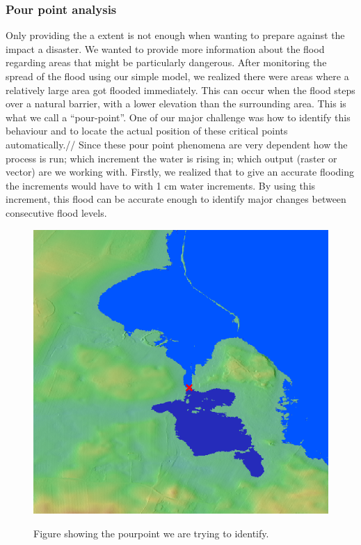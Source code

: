 \subsubsection{Pour point analysis}
Only providing the a extent is not enough when wanting to prepare against the impact a disaster. We wanted to provide more information about the flood regarding areas that might be particularly dangerous. After monitoring the  spread of the flood using our simple model, we realized there were areas where a relatively large area got flooded immediately. This can occur when the flood steps over a natural barrier, with a lower elevation than the surrounding area. This is what we call a “pour-point”. One of our major challenge was how to identify this behaviour and to locate the actual position of these critical points automatically.// 
Since these pour point phenomena are very dependent how the process is run; which increment the water is rising in; which output (raster or vector) are we working with. Firstly, we realized that to give an accurate flooding the increments would have to with 1 cm water increments. By using this increment, this flood can be accurate enough to identify major changes between consecutive flood levels.

\begin{figure}[h!]
\centering
	{\includegraphics[width=.45\linewidth]{gfx/Pourpoint.png}}
\caption{Figure showing the pourpoint we are trying to identify.}
\label{fig:pourpoint}
\end{figure}

